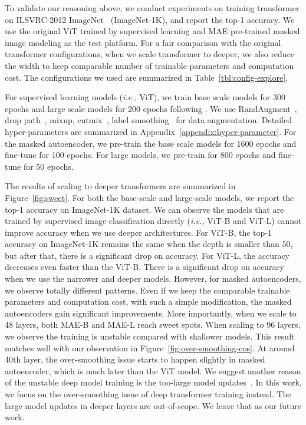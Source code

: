 \documentclass{article}
\theoremstyle{plain}
\theoremstyle{definition}
\theoremstyle{remark}
\newcommand{\ie}{\emph{i.e.,}\xspace}
\begin{document}
To validate our reasoning above, we conduct experiments on training transformer on ILSVRC-2012 ImageNet~\citep{deng2009imagenet} (ImageNet-1K), and report the top-1 accuracy. We use the original ViT trained by supervised learning and MAE pre-trained masked image modeling as the test platform. For a fair comparison with the original transformer configurations, when we scale transformer to deeper, we also reduce the width to keep comparable number of trainable parameters and computation cost. The configurations we used are summarized in Table~\ref{tbl:config-explore}.


For supervised learning models (\ie ViT), we train base scale models for 300 epochs and large scale models for 200 epochs following \citet{he2021masked}. We use RandAugment~\citep{cubuk2020randaugment}, drop path~\citep{huang2016deep}, mixup, cutmix~\citep{yun2019cutmix}, label smoothing~\citep{szegedy2016rethinking} for data augmentation.  Detailed hyper-parameters are summarized in Appendix~\ref{appendix:hyper-parameter}. For the masked autoencoder, we pre-train the base scale models for 1600 epochs and fine-tune for 100 epochs. For large models, we pre-train for 800 epochs and fine-tune for 50 epochs.





The results of scaling to deeper transformers are summarized in Figure~\ref{fig:sweet}. For both the base-scale and large-scale models, we report the top-1 accuracy on ImageNet-1K dataset. We can observe the models that are trained by supervised image classification directly (\ie ViT-B and ViT-L) cannot improve accuracy when we use  deeper architectures. For ViT-B, the top-1 accuracy on ImageNet-1K remains the same when the depth is smaller than 50, but after that, there is a significant drop on accuracy. For ViT-L, the accuracy decreases even faster than the ViT-B. There is a significant drop on accuracy  when we use the narrower and deeper models. However, for masked autoencoders, we observe totally different patterns. Even if we keep the comparable trainable parameters and computation cost, with such a simple modification, the masked autoencoders gain significant improvements. More importantly, when we scale to 48 layers, both 
MAE-B and MAE-L reach sweet spots. When scaling to 96 layers, we observe the training is unstable compared with shallower models. This result matches well with our observation in Figure~\ref{fig:over-smoothing-cos}. At around 40th layer, the over-smoothing issue starts to happen slightly in masked autoencoder, which is much later than the ViT model. We suggest another reason of the unstable deep model training is the too-large model updates~\citep{wang2022deepnet}. In this work, we focus on the over-smoothing issue of deep transformer training instead. The large model updates in deeper layers are out-of-scope. We leave that as our future work.
\end{document}
